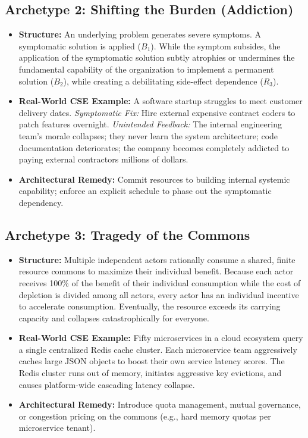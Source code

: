 \subsection{Archetype 2: Shifting the Burden (Addiction)}
\begin{itemize}[leftmargin=1.5em]
    \item \textbf{Structure:} An underlying problem generates severe symptoms. A symptomatic solution is applied ($B_1$). While the symptom subsides, the application of the symptomatic solution subtly atrophies or undermines the fundamental capability of the organization to implement a permanent solution ($B_2$), while creating a debilitating side-effect dependence ($R_3$).
    \item \textbf{Real-World CSE Example:} A software startup struggles to meet customer delivery dates. \textit{Symptomatic Fix:} Hire external expensive contract coders to patch features overnight. \textit{Unintended Feedback:} The internal engineering team's morale collapses; they never learn the system architecture; code documentation deteriorates; the company becomes completely addicted to paying external contractors millions of dollars.
    \item \textbf{Architectural Remedy:} Commit resources to building internal systemic capability; enforce an explicit schedule to phase out the symptomatic dependency.
\end{itemize}

\subsection{Archetype 3: Tragedy of the Commons}
\begin{itemize}[leftmargin=1.5em]
    \item \textbf{Structure:} Multiple independent actors rationally consume a shared, finite resource commons to maximize their individual benefit. Because each actor receives 100\% of the benefit of their individual consumption while the cost of depletion is divided among all actors, every actor has an individual incentive to accelerate consumption. Eventually, the resource exceeds its carrying capacity and collapses catastrophically for everyone.
    \item \textbf{Real-World CSE Example:} Fifty microservices in a cloud ecosystem query a single centralized Redis cache cluster. Each microservice team aggressively caches large JSON objects to boost their own service latency scores. The Redis cluster runs out of memory, initiates aggressive key evictions, and causes platform-wide cascading latency collapse.
    \item \textbf{Architectural Remedy:} Introduce quota management, mutual governance, or congestion pricing on the commons (e.g., hard memory quotas per microservice tenant).
\end{itemize}

